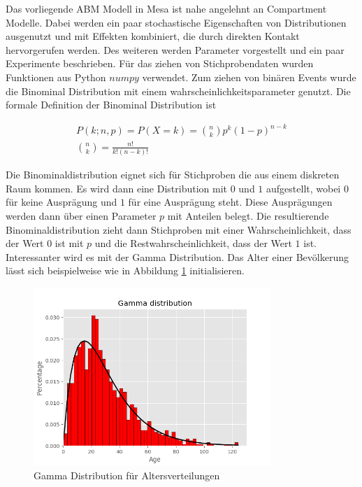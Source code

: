 \documentclass[paper=a4, fontsize=11pt, ngerman, abstract=on]{scrartcl}
\numberwithin{equation}{section} %
\numberwithin{figure}{section} %
\numberwithin{table}{section} %
\begin{document}
Das vorliegende ABM Modell in Mesa ist nahe angelehnt an Compartment Modelle. Dabei werden ein paar stochastische Eigenschaften von Distributionen ausgenutzt und mit Effekten kombiniert, die durch direkten Kontakt hervorgerufen werden. Des weiteren werden Parameter vorgestellt und ein paar Experimente beschrieben. Für das ziehen von Stichprobendaten wurden Funktionen aus Python $numpy$ verwendet. Zum ziehen von binären Events wurde die Binominal Distribution mit einem wahrscheinlichkeitsparameter genutzt. Die formale Definition der Binominal Distribution ist

\begin{gather*}
  P(k; n, p) = P(X = k) = \binom{n}{k}p^{k}(1 - p)^{n - k} \\
  \binom{n}{k} = \frac{n!}{k!(n-k)!}
\end{gather*}

Die Binominaldistribution eignet sich für Stichproben die aus einem diskreten Raum kommen. Es wird dann eine Distribution mit $0$ und $1$ aufgestellt, wobei $0$ für keine Ausprägung und $1$ für eine Ausprägung steht. Diese Ausprägungen werden dann über einen Parameter $p$ mit Anteilen belegt. Die resultierende Binominaldistribution zieht dann Stichproben mit einer Wahrscheinlichkeit, dass der Wert $0$ ist mit $p$ und die Restwahrscheinlichkeit, dass der Wert $1$ ist. Interessanter wird es mit der Gamma Distribution. Das Alter einer Bevölkerung lässt sich beispielweise wie in Abbildung \ref{fig:gamma-age-dist} initialisieren.

\begin{figure}[ht]
  \centering
  \includegraphics[width=0.8\textwidth,keepaspectratio]{images/gamma-age-dist}
  \caption{Gamma Distribution für Altersverteilungen}
  \label{fig:gamma-age-dist}
\end{figure}
\end{document}
